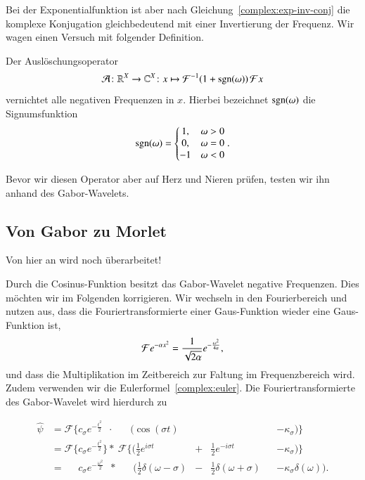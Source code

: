 Bei der Exponentialfunktion ist aber nach Gleichung~\ref{complex:exp-inv-conj} die komplexe Konjugation gleichbedeutend mit einer Invertierung der Frequenz.
Wir wagen einen Versuch mit folgender Definition.
\begin{definition}
	Der Auslöschungsoperator
		\[\Ana\, \colon \mathbb R^X \to \mathbb C^X
		\colon
		x \mapsto \mathcal{F}^{-1}(1+\sgn(\omega))\Four x\]
	vernichtet alle negativen Frequenzen in $x$.
	Hierbei bezeichnet $\sgn(\omega)$ die Signumsfunktion
	\[\sgn(\omega) = \left\lbrace\begin{matrix} 1, & \omega > 0 \\ 0, &\omega = 0 \\ -1 & \omega < 0 \end{matrix}\right..\]
\end{definition}
Bevor wir diesen Operator aber auf Herz und Nieren prüfen, testen wir ihn anhand des Gabor-Wavelets.

\subsection{Von Gabor zu Morlet}
\label{complex:gabor-to-morlet}

{\Huge Von hier an wird noch überarbeitet!}

Durch die Cosinus-Funktion besitzt das Gabor-Wavelet negative Frequenzen.
Dies möchten wir im Folgenden korrigieren.
Wir wechseln in den Fourierbereich und nutzen aus, dass die Fouriertransformierte einer Gaus-Funktion wieder eine Gaus-Funktion ist,
\[
	\Four e^{-\alpha x^2} 
	= \frac{1}{\sqrt{2\alpha}}e^{- \frac{\omega^2}{4\alpha}},
\]
und dass die Multiplikation im Zeitbereich zur Faltung im Frequenzbereich wird.
Zudem verwenden wir die Eulerformel~\eqref{complex:euler}.
Die Fouriertransformierte des Gabor-Wavelet wird hierdurch zu

\begin{equation*}
\begin{aligned}
 \hat{\psi}
 & = \mathcal{F}\Bigg\lbrace c_\sigma e^{-\frac{t^2}{2}}\phantom{\Bigg\rbrace}
 \cdot\; \phantom{\mathcal{F}\Bigg\lbrace}
 \Bigg(\cos\left(\sigma t\right) &&
 &&- \kappa_\sigma\Bigg) \Bigg\rbrace \\
 & = \mathcal{F}\Bigg\lbrace c_\sigma e^{-\frac{t^2}{2}} \Bigg\rbrace 
 *\: \mathcal{F}\Bigg\lbrace\Bigg( \frac12 e^{i\sigma t} &+& \frac12 e^{-i\sigma t}
 &&- \kappa_\sigma \Bigg)\Bigg\rbrace\\
 & = \phantom{\mathcal{F}\Bigg\lbrace} c_\sigma e^{- \frac{\omega^2}{2}} \phantom{\Big\rbrace}
 *\:\phantom{\mathcal{F}\Bigg\lbrace} \Bigg(
  \frac{1}{2}\delta(\omega - \sigma) &-&
  \frac{1}{2}\delta(\omega + \sigma) 
 && - \kappa_\sigma\delta(\omega)
  \Bigg).
\end{aligned}
\end{equation*}

